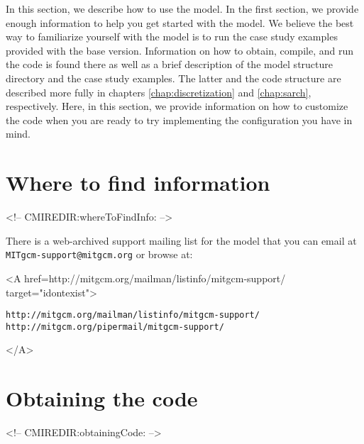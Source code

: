 

In this section, we describe how to use the model. In the first
section, we provide enough information to help you get started with
the model. We believe the best way to familiarize yourself with the
model is to run the case study examples provided with the base
version. Information on how to obtain, compile, and run the code is
found there as well as a brief description of the model structure
directory and the case study examples.  The latter and the code
structure are described more fully in chapters
\ref{chap:discretization} and \ref{chap:sarch}, respectively. Here, in
this section, we provide information on how to customize the code when
you are ready to try implementing the configuration you have in mind.

\section{Where to find information}
\label{sect:whereToFindInfo}
\begin{rawhtml}
<!-- CMIREDIR:whereToFindInfo: -->
\end{rawhtml}

There is a web-archived support mailing list for the model that
you can email at \texttt{MITgcm-support@mitgcm.org} or browse at:
\begin{rawhtml} <A href=http://mitgcm.org/mailman/listinfo/mitgcm-support/ target="idontexist"> \end{rawhtml}
\begin{verbatim}
http://mitgcm.org/mailman/listinfo/mitgcm-support/
http://mitgcm.org/pipermail/mitgcm-support/
\end{verbatim}
\begin{rawhtml} </A> \end{rawhtml}

\section{Obtaining the code}
\label{sect:obtainingCode}
\begin{rawhtml}
<!-- CMIREDIR:obtainingCode: -->
\end{rawhtml}

